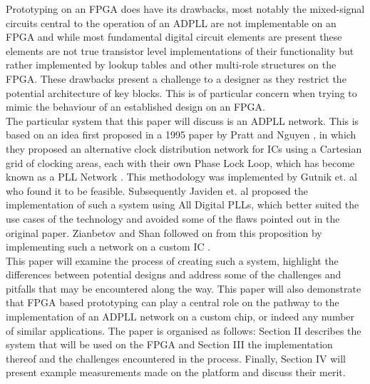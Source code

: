 \documentclass[conference]{IEEEtran}
\begin{document}
Prototyping on an FPGA does have its drawbacks, most notably the mixed-signal circuits central to the operation of an ADPLL are not implementable on an FPGA and while most fundamental digital circuit elements are present these elements are not true transistor level implementations of their functionality but rather implemented by lookup tables and other multi-role structures on the FPGA. These drawbacks present a challenge to a designer as they restrict the potential architecture of key blocks. This is of particular concern when trying to mimic the behaviour of an established design on an FPGA.\\
The particular system that this paper will discuss is an ADPLL network. This is based on an idea first proposed in a 1995 paper by Pratt and Nguyen \cite{pratt1995distributed}, in which they proposed an alternative clock distribution network for ICs using a Cartesian grid of clocking areas, each with their own Phase Lock Loop, which has become known as a PLL Network . This methodology was implemented by Gutnik et. al \cite{gutnik2000active} who found it to be feasible. Subsequently Javiden et. al
\cite{javidan2011all} proposed the implementation of such a system using All Digital PLLs, which better suited the use cases of the technology and avoided some of the flaws pointed out in the original paper. Zianbetov and Shan followed on from this proposition by implementing such a network on a custom IC \cite{zianbetov2013phd,shan2014phd}.\\
This paper will examine the process of creating such a system, highlight the differences between potential designs and address some of the challenges and pitfalls that may be encountered along the way. This paper will also demonstrate that FPGA based prototyping can play a central role on the pathway to the implementation of an ADPLL network on a custom chip, or indeed any number of similar applications. The paper is organised as follows: Section II describes the system that will be used on the FPGA and Section III the implementation thereof and the challenges encountered in the process. Finally, Section IV will present example measurements made on the platform and discuss their merit.
\end{document}
